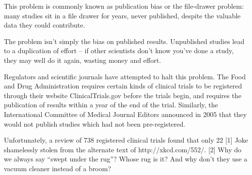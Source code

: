 This problem is commonly known as publication bias or the file-drawer problem: many studies sit in a file drawer for years, never published, despite the valuable data they could contribute.

The problem isn’t simply the bias on published results. Unpublished studies lead to a duplication of effort – if other scientists don’t know you’ve done a study, they may well do it again, wasting money and effort.

Regulators and scientific journals have attempted to halt this problem. The Food and Drug Administration requires certain kinds of clinical trials to be registered through their website ClinicalTrials.gov before the trials begin, and requires the publication of results within a year of the end of the trial. Similarly, the International Committee of Medical Journal Editors announced in 2005 that they would not publish studies which had not been pre-registered.

Unfortunately, a review of 738 registered clinical trials found that only 22%
[1]	Joke shamelessly stolen from the alternate text of http://xkcd.com/552/.
[2]	Why do we always say “swept under the rug”? Whose rug is it? And why don’t they use a vacuum cleaner instead of a broom?